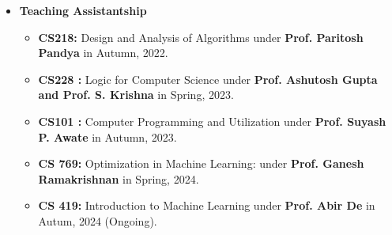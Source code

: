 \documentclass[a4paper,10.5pt]{article}
\begin{document}
\begin{itemize}[noitemsep,nolistsep]
\item \textbf{Teaching Assistantship}
\vspace{0.1cm}
\begin{itemize}[noitemsep,nolistsep]
    \item \textbf{CS218: } Design and Analysis of Algorithms under \textbf{Prof. Paritosh Pandya} in Autumn, 2022.
    \vspace{0.07cm}    
    \item \textbf{CS228 :} Logic for Computer Science under \textbf{Prof.  Ashutosh Gupta and Prof. S. Krishna} in Spring, 2023.
    \vspace{0.07cm}
    \item \textbf{CS101 :} Computer Programming and Utilization under \textbf{Prof. Suyash P. Awate} in Autumn, 2023.
    \vspace{0.07cm}
    \item \textbf{CS 769:}	Optimization in Machine Learning:  under \textbf{Prof. Ganesh Ramakrishnan} in Spring, 2024.
    \vspace{0.07cm}
    \item \textbf{CS 419:}	Introduction to Machine Learning  under \textbf{Prof. Abir De} in Autum, 2024 (Ongoing).
\end{itemize}

\end{itemize}

\vspace{0.15cm}
\end{document}
